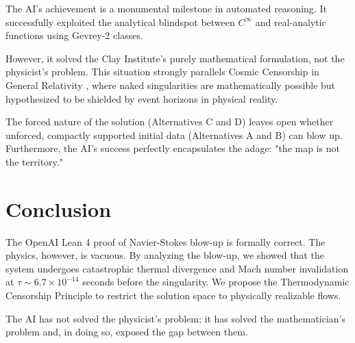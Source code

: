\documentclass[11pt,a4paper]{article}
\theoremstyle{definition}
\begin{document}
The AI's achievement is a monumental milestone in automated reasoning. It successfully exploited the analytical blindspot between $C^\infty$ and real-analytic functions using Gevrey-2 classes.

However, it solved the Clay Institute's purely mathematical formulation, not the physicist's problem. This situation strongly parallels Cosmic Censorship in General Relativity \cite{Penrose1969}, where naked singularities are mathematically possible but hypothesized to be shielded by event horizons in physical reality.

The forced nature of the solution (Alternatives C and D) leaves open whether unforced, compactly supported initial data (Alternatives A and B) can blow up. Furthermore, the AI's success perfectly encapsulates the adage: "the map is not the territory."

\section{Conclusion}

The OpenAI Lean 4 proof of Navier-Stokes blow-up is formally correct. The physics, however, is vacuous. By analyzing the blow-up, we showed that the system undergoes catastrophic thermal divergence and Mach number invalidation at $\tau \sim 6.7 \times 10^{-14}$ seconds before the singularity. We propose the Thermodynamic Censorship Principle to restrict the solution space to physically realizable flows. 

The AI has not solved the physicist's problem; it has solved the mathematician's problem and, in doing so, exposed the gap between them.
\end{document}
